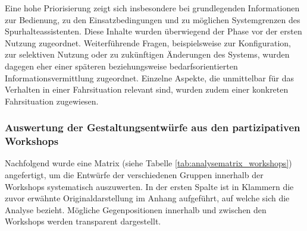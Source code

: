 Eine hohe Priorisierung zeigt sich insbesondere bei grundlegenden Informationen zur Bedienung, zu den Einsatzbedingungen und zu möglichen Systemgrenzen des Spurhalteassistenten. Diese Inhalte wurden überwiegend der Phase vor der ersten Nutzung zugeordnet. Weiterführende Fragen, beispielsweise zur Konfiguration, zur selektiven Nutzung oder zu zukünftigen Änderungen des Systems, wurden dagegen eher einer späteren beziehungsweise bedarfsorientierten Informationsvermittlung zugeordnet. Einzelne Aspekte, die unmittelbar für das Verhalten in einer Fahrsituation relevant sind, wurden zudem einer konkreten Fahrsituation zugewiesen.

\subsubsection{Auswertung der Gestaltungsentwürfe aus den partizipativen Workshops}
\label{subsubsec:Auswertung_Entwuerfe_Workshops}

Nachfolgend wurde eine Matrix (siehe Tabelle \ref{tab:analysematrix_workshops}) angefertigt, um die Entwürfe der verschiedenen Gruppen innerhalb der Workshops systematisch auszuwerten. In der ersten Spalte ist in Klammern die zuvor erwähnte Originaldarstellung im Anhang aufgeführt, auf welche sich die Analyse bezieht. Mögliche Gegenpositionen innerhalb und zwischen den Workshops werden transparent dargestellt.

